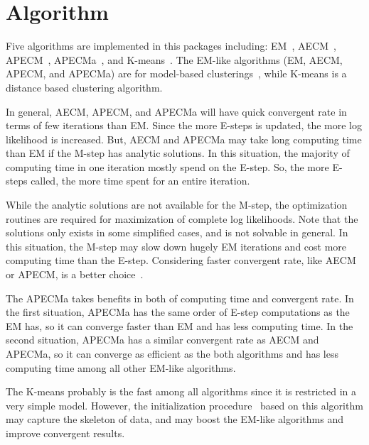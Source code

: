 \section[Algorithm]{Algorithm}
\label{sec:algorithm}

Five algorithms are implemented in this packages including:
EM~\citep{Dempster1977}, AECM~\citep{Meng1997}, APECM~\citep{Chen2011},
APECMa~\citep{Chen2012a}, and K-means~\citep{Lloyd1982}.
The EM-like algorithms (EM, AECM, APECM, and APECMa) are for model-based
clusterings~\citep{Fraley2002},
while K-means is a distance based clustering algorithm.

In general, AECM, APECM, and APECMa will have quick convergent rate in terms
of few iterations than EM. Since the more E-steps is updated,
the more log likelihood is increased.
But, AECM and APECMa may take long computing time
than EM if the M-step has analytic solutions. In this situation, the majority
of computing time in one iteration mostly spend on the E-step. So, the more
E-steps called, the more time spent for an entire iteration.

While the analytic solutions are not available for the M-step, the
optimization routines are required for maximization of complete log
likelihoods. Note that the solutions only exists in some simplified cases,
and is not solvable in general.
In this situation, the M-step may slow down hugely
EM iterations and cost more computing time than the E-step.
Considering faster convergent rate, like AECM or APECM,
is a better choice~\citep{Chen2011}.

The APECMa takes benefits in both of computing time and convergent rate.
In the first situation, APECMa has the same order of E-step computations
as the EM has, so it can converge faster than EM and has less computing time.
In the second situation, APECMa has a similar convergent rate as AECM
and APECMa, so it can converge as efficient as the both algorithms and
has less computing time among all other EM-like algorithms.

The K-means probably is the fast among all algorithms since it is restricted
in a very simple model. However, the initialization procedure~\citep{Maitra2009}
based on this algorithm may capture the skeleton of data, and may boost
the EM-like algorithms and improve convergent results.

